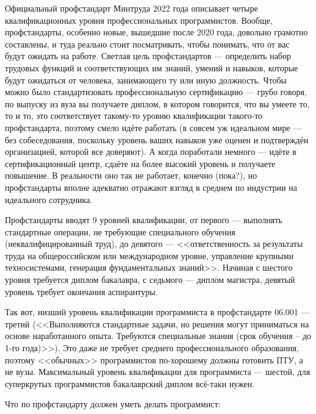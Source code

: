 \documentclass{../../text-style}
\begin{document}
Официальный профстандарт Минтруда 2022 года описывает четыре квалификационных уровня профессиональных программистов. Вообще, профстандарты, особенно новые, вышедшие после 2020 года, довольно грамотно составлены, и туда реально стоит посматривать, чтобы понимать, что от вас будут ожидать на работе. Светлая цель профстандартов --- определить набор трудовых функций и соответствующих им знаний, умений и навыков, которые будут ожидаться от человека, занимающего ту или иную должность. Чтобы можно было стандартизовать профессиональную сертификацию --- грубо говоря, по выпуску из вуза вы получаете диплом, в котором говорится, что вы умеете то, то и то, это соответствует такому-то уровню квалификации такого-то профстандарта, поэтому смело идёте работать (в совсем уж идеальном мире --- без собеседования, поскольку уровень ваших навыков уже оценен и подтверждён организацией, которой все доверяют). А когда поработали немного --- идёте в сертификационный центр, сдаёте на более высокий уровень и получаете повышение. В реальности оно так не работает, конечно (пока?), но профстандарты вполне адекватно отражают взгляд в среднем по индустрии на идеального сотрудника.

Профстандарты вводят 9 уровней квалификации, от первого --- выполнять стандартные операции, не требующие специального обучения (неквалифицированный труд), до девятого --- <<ответственность за результаты труда на общероссийском или международном уровне, управление крупными техносистемами, генерация фундаментальных знаний>>. Начиная с шестого уровня требуется диплом бакалавра, с седьмого --- диплом магистра, девятый уровень требует окончания аспирантуры. 

Так вот, низший уровень квалификации программиста в профстандарте 06.001 --- третий (<<Выполняются стандартные задачи, но решения могут приниматься на основе наработанного опыта. Требуются специальные знания (срок обучения – до 1-го года)>>). Это даже не требует среднего профессионального образования, поэтому <<обычных>> программистов по-хорошему должны готовить ПТУ, а не вузы. Максимальный уровень квалификации для программиста --- шестой, для суперкрутых программистов бакалаврский диплом всё-таки нужен.

Что по профстандарту должен уметь делать программист:
\end{document}
